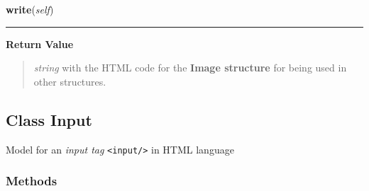     \label{module_Web:Image:write}

    \vspace{0.5ex}

\hspace{.8\funcindent}\begin{boxedminipage}{\funcwidth}

    \raggedright \textbf{write}(\textit{self})

    \vspace{-1.5ex}

    \rule{\textwidth}{0.5\fboxrule}
\setlength{\parskip}{2ex}
\setlength{\parskip}{1ex}
      \textbf{Return Value}
    \vspace{-1ex}

      \begin{quote}

\emph{string} with the HTML code for the \textbf{Image structure} for being used in other structures.
      \end{quote}

    \end{boxedminipage}



\subsection{Class Input}

    \label{module_Web:Input}

Model for an \emph{input tag} \texttt{<input/>} in HTML language


  \subsubsection{Methods}

